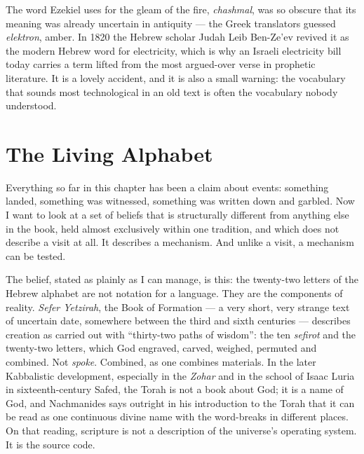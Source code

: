 \begin{funfact}
The word Ezekiel uses for the gleam of the fire, \emph{chashmal}, was so obscure that its meaning
was already uncertain in antiquity --- the Greek translators guessed \emph{elektron}, amber. In
1820 the Hebrew scholar Judah Leib Ben-Ze'ev revived it as the modern Hebrew word for electricity,
which is why an Israeli electricity bill today carries a term lifted from the most argued-over
verse in prophetic literature. It is a lovely accident, and it is also a small warning: the
vocabulary that sounds most technological in an old text is often the vocabulary nobody
understood.
\end{funfact}

\section{The Living Alphabet}\label{sec:livingalphabet}

Everything so far in this chapter has been a claim about events: something landed, something was
witnessed, something was written down and garbled. Now I want to look at a set of beliefs that is
structurally different from anything else in the book, held almost exclusively within one
tradition, and which does not describe a visit at all. It describes a mechanism. And unlike a
visit, a mechanism can be tested.

The belief, stated as plainly as I can manage, is this: the twenty-two letters of the Hebrew
alphabet are not notation for a language. They are the components of reality. \emph{Sefer
Yetzirah}, the Book of Formation --- a very short, very strange text of uncertain date, somewhere
between the third and sixth centuries --- describes creation as carried out with ``thirty-two paths
of wisdom'': the ten \emph{sefirot} and the twenty-two letters, which God engraved, carved,
weighed, permuted and combined. Not \emph{spoke}. Combined, as one combines materials. In the later
Kabbalistic development, especially in the \emph{Zohar} and in the school of Isaac Luria in
sixteenth-century Safed, the Torah is not a book about God; it is a name of God, and Nachmanides
says outright in his introduction to the Torah that it can be read as one continuous divine name
with the word-breaks in different places. On that reading, scripture is not a description of the
universe's operating system. It is the source code.

